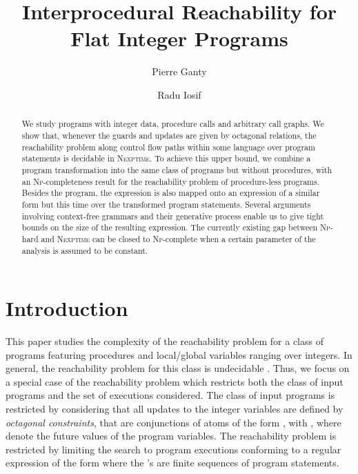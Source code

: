 \documentclass[final]{llncs}
\title{Interprocedural Reachability for Flat Integer Programs}
\author{Pierre Ganty\inst{1} \and Radu Iosif\inst{2}}
\institute{IMDEA Software Institute \quad  CNRS/VERIMAG, Grenoble, France}
\begin{document}
\maketitle

\begin{abstract}
We study programs with integer data, procedure calls and arbitrary
call graphs. We show that, whenever the guards and updates are given
by octagonal relations, the reachability problem along control flow
paths within some language  over program
statements is decidable in \textsc{Nexptime}. To achieve this upper
bound, we combine a program transformation into the same class of
programs but without procedures, with an \textsc{Np}-completeness
result for the reachability problem of procedure-less
programs. Besides the program, the expression 
is also mapped onto an expression of a similar form but this time over
the transformed program statements. Several arguments involving
context-free grammars and their generative process enable us to give
tight bounds on the size of the resulting expression. The currently
existing gap between \textsc{Np}-hard and \textsc{Nexptime} can be
closed to \textsc{Np}-complete when a certain parameter of the
analysis is assumed to be constant.
\end{abstract}



\section{Introduction}

This paper studies the complexity of the reachability problem for a
class of programs featuring procedures and local/global variables
ranging over integers. In general, the reachability problem for this
class is undecidable \cite{minsky67}. Thus, we focus on a special case
of the reachability problem which restricts both the class of input
programs and the set of executions considered. The class of input
programs is restricted by considering that all updates to the integer
variables  are defined by \emph{octagonal constraints}, that
are conjunctions of atoms of the form , with
, where  denote the future values
of the program variables. The reachability problem is restricted by
limiting the search to program executions conforming to a regular
expression of the form  where the 's are
finite sequences of program statements.
\end{document}
